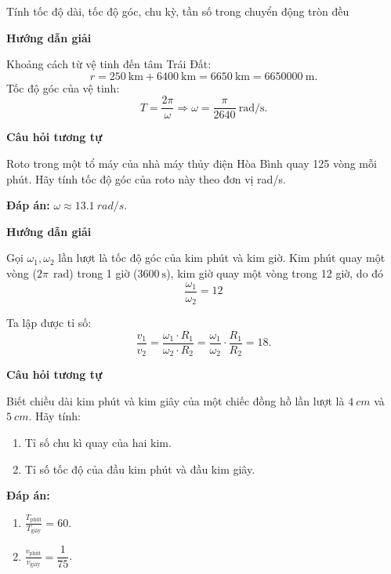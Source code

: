 \begin{dang}{Tính tốc độ dài, tốc độ góc, chu kỳ, tần số trong chuyển động tròn đều}
	{	\begin{center}
			\textbf{Hướng dẫn giải}
		\end{center}
		Khoảng cách từ vệ tinh đến tâm Trái Đất: 
		$$r=250\ \text{km}+6400\ \text{km} =6650\ \text{km}=6650000\ \text{m}. $$
		Tốc độ góc của vệ tinh:
		$$T=\frac{2\pi}{\omega} \Rightarrow \omega = \frac{\pi}{2640}\ \text{rad/s}.$$ 
		
		\begin{center}
			\textbf{Câu hỏi tương tự}
		\end{center}
		
		Roto trong một tổ máy của nhà máy thủy điện Hòa Bình quay 125 vòng mỗi phút. Hãy tính tốc độ góc của roto này theo đơn vị rad/s.
		
		\textbf{Đáp án:} $\omega \approx \SI{13.1}{rad/s}$.
	}
	
	{	\begin{center}
			\textbf{Hướng dẫn giải}
		\end{center}
		
		Gọi $\omega_1, \omega_2$ lần lượt là tốc độ góc của kim phút và kim giờ. Kim phút quay một vòng ($2\pi\ \SI{}{\radian}$) trong 1 giờ ($\SI{3600}{\second}$), kim giờ quay một vòng trong 12 giờ, do đó 
		$$
		\dfrac{\omega_1}{\omega_2}=12
		$$
		
		Ta lập được tỉ số: $$\dfrac{v_1}{v_2}=\dfrac{\omega_1 \cdot R_1}{\omega_2 \cdot R_2}=\dfrac{\omega_1}{\omega_2}\cdot\dfrac{R_1}{R_2}=18.$$
		
		\begin{center}
			\textbf{Câu hỏi tương tự}
		\end{center}
		
		Biết chiều dài kim phút và kim giây của một chiếc đồng hồ lần lượt là $\SI{4}{cm}$ và $\SI{5}{cm}$. Hãy tính:
		\begin{enumerate}[label=\alph*)]
			\item Tỉ số chu kì quay của hai kim.
			\item Tỉ số tốc độ của đầu kim phút và đầu kim giây.
		\end{enumerate}
		
		\textbf{Đáp án:}
		\begin{enumerate}[label=\alph*)]
			\item $\frac{T_\text{phút}}{T_\text{giây}}=60$.
			\item $\frac{v_\text{phút}}{v_\text{giây}}=\dfrac{1}{75}$.
		\end{enumerate}
	}
	
	
	
\end{dang}